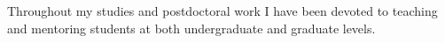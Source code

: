 \documentclass[a4paper,12pt]{article}
\begin{document}
Throughout my studies and postdoctoral work I have been devoted to teaching and mentoring students at both undergraduate and graduate levels.









\end{document}
